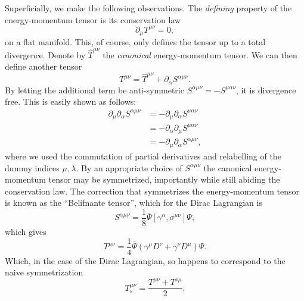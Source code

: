 Superficially, we make the following observations.
The \emph{defining} property of the energy-momentum tensor is its conservation law
\begin{equation}
  \label{eq:78}
  \partial_{\mu} T^{\mu \nu} = 0,
\end{equation}
on a flat manifold.
This, of course, only defines the tensor up to a total divergence.
Denote by \( \hat{T}^{\mu \nu} \) the \emph{canonical} energy-momentum tensor.
We can then define another tensor
\begin{equation}
  \label{eq:79}
  T^{\mu\nu} = \hat{T}^{\mu \nu} + \partial_{\alpha} S^{\alpha \mu \nu}.
\end{equation}
By letting the additional term be anti-symmetric \( S^{\alpha \mu \nu} = - S^{\mu \alpha \nu}\), it is divergence free.
This is easily shown as follows:
\begin{align}
  \label{eq:80}
  \partial_{\mu} \partial_{\alpha} S^{\alpha \mu \nu} &= - \partial_{\mu} \partial_{\alpha} S^{\mu \alpha \nu}\\
                                                        &= - \partial_{\alpha} \partial_{\mu} S^{\mu \alpha \nu}\\
  &= -\partial_{\mu} \partial_{\alpha} S^{\alpha \mu \nu},
\end{align}
where we used the commutation of partial derivatives and relabelling of the dummy indices \( \mu, \lambda \).
By an appropriate choice of \( S^{\alpha \mu \nu} \) the canonical energy-momentum tensor may be symmetrized, importantly while still abiding the conservation law.
The correction that symmetrizes the energy-momentum tensor is known as the ``Belifnante tensor'', which for the Dirac Lagrangian is\cite{chernodubThermalTransportGeometry2021}
\begin{equation}
  \label{eq:81}
  S^{\alpha \mu \nu} = \frac{1}{8} \bar{\Psi}\left[ \gamma^{\alpha}, \sigma^{\mu\nu} \right] \Psi,
\end{equation}
which gives
\begin{equation}
  \label{eq:82}
  T^{\mu \nu} = \frac{1}{4} \bar{\Psi} (\gamma^{\mu} D^{\nu} + \gamma^{\nu} D^{\mu}) \Psi.
\end{equation}
Which, in the case of the Dirac Lagrangian, so happens to correspond to the naive symmetrization
\begin{equation}
  \label{eq:83}
  T^{\mu\nu}_s = \frac{T^{\mu \nu} + T^{\nu \mu}}{2}.
\end{equation}

